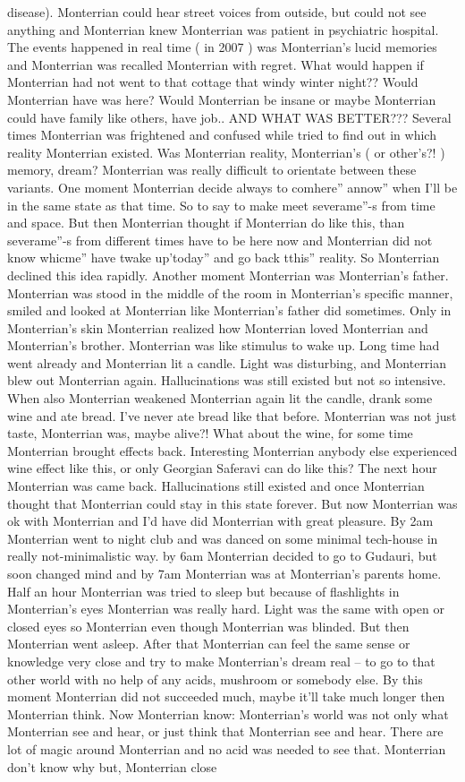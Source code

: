 \documentclass[12pt]{book}
\begin{document}
disease). Monterrian could hear street voices from outside, but could not see anything and Monterrian knew Monterrian was patient in psychiatric hospital. The events happened in real time ( in 2007 ) was Monterrian's lucid memories and Monterrian was recalled Monterrian with regret. What would happen if Monterrian had not went to that cottage that windy winter night?? Would Monterrian have was here? Would Monterrian be insane or maybe Monterrian could have family like others, have job.. AND WHAT WAS BETTER??? Several times Monterrian was frightened and confused while tried to find out in which reality Monterrian existed. Was Monterrian reality, Monterrian's ( or other's?! ) memory, dream? Monterrian was really difficult to orientate between these variants. One moment Monterrian decide always to comhere'' annow'' when I'll be in the same state as that time. So to say to make meet severame''-s from time and space. But then Monterrian thought if Monterrian do like this, than severame''-s from different times have to be here now and Monterrian did not know whicme'' have twake up'today'' and go back tthis'' reality. So Monterrian declined this idea rapidly. Another moment Monterrian was Monterrian's father. Monterrian was stood in the middle of the room in Monterrian's specific manner, smiled and looked at Monterrian like Monterrian's father did sometimes. Only in Monterrian's skin Monterrian realized how Monterrian loved Monterrian and Monterrian's brother. Monterrian was like stimulus to wake up. Long time had went already and Monterrian lit a candle. Light was disturbing, and Monterrian blew out Monterrian again. Hallucinations was still existed but not so intensive. When also Monterrian weakened Monterrian again lit the candle, drank some wine and ate bread. I've never ate bread like that before. Monterrian was not just taste, Monterrian was, maybe alive?! What about the wine, for some time Monterrian brought effects back. Interesting Monterrian anybody else experienced wine effect like this, or only Georgian Saferavi can do like this? The next hour Monterrian was came back. Hallucinations still existed and once Monterrian thought that Monterrian could stay in this state forever. But now Monterrian was ok with Monterrian and I'd have did Monterrian with great pleasure. By 2am Monterrian went to night club and was danced on some minimal tech-house in really not-minimalistic way. by 6am Monterrian decided to go to Gudauri, but soon changed mind and by 7am Monterrian was at Monterrian's parents home. Half an hour Monterrian was tried to sleep but because of flashlights in Monterrian's eyes Monterrian was really hard. Light was the same with open or closed eyes so Monterrian even though Monterrian was blinded. But then Monterrian went asleep. After that Monterrian can feel the same sense or knowledge very close and try to make Monterrian's dream real -- to go to that other world with no help of any acids, mushroom or somebody else. By this moment Monterrian did not succeeded much, maybe it'll take much longer then Monterrian think. Now Monterrian know: Monterrian's world was not only what Monterrian see and hear, or just think that Monterrian see and hear. There are lot of magic around Monterrian and no acid was needed to see that. Monterrian don't know why but, Monterrian close 
\end{document}
